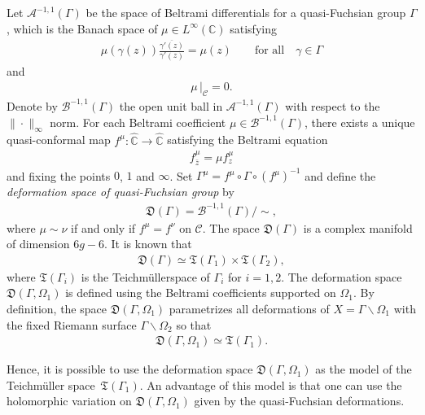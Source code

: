 \documentclass[10pt,a4paper]{amsart}
\numberwithin{equation}{section}
\newcommand{\Te}{Teichm\"{u}ller\:}
\begin{document}
Let $\mathcal{A}^{-1,1}(\Gamma)$ be the space of Beltrami differentials for a quasi-Fuchsian group $\Gamma$, which is the Banach space of $\mu\in L^\infty(\mathbb{C})$ satisfying
\begin{gather*}
\mu(\gamma(z)) \frac{\overline{\gamma'(z)}}{\gamma'(z)} =\mu(z) \qquad \text{for all}\quad \gamma\in\Gamma
\end{gather*}
and
\begin{gather*}
\mu\, \big|_{\mathcal{C}} =0.
\end{gather*}
Denote by $\mathcal{B}^{-1,1}(\Gamma)$ the open unit ball in $\mathcal{A}^{-1,1}(\Gamma)$ with respect to the $\|\cdot\|_{\infty}$ norm. For each Beltrami coefficient
$\mu\in\mathcal{B}^{-1,1}(\Gamma)$, there exists a unique quasi-conformal map $f^\mu\colon\hat{\mathbb{C}} \to \hat{\mathbb{C}}$ satisfying the Beltrami equation
\begin{gather}\label{e:beltrami-eq}
f^\mu_{\bar{z}} =\mu f^\mu_z
\end{gather}
and fixing the points $0$, $1$ and $\infty$. Set $\Gamma^\mu= f^\mu \circ \Gamma\circ (f^\mu)^{-1}$ and define the \emph{deformation space of quasi-Fuchsian group} by
\begin{gather*}
\mathfrak{D}(\Gamma) =\mathcal{B}^{-1,1}(\Gamma)/ {\sim},
\end{gather*}
where $\mu\sim \nu$ if and only if $f^\mu=f^\nu$ on $\mathcal{C}$. The space $\mathfrak{D}(\Gamma)$ is a complex manifold of dimension $6g-6$. It is known that
\begin{gather*}%
\mathfrak{D}(\Gamma) \simeq \mathfrak{T}(\Gamma_1)\times {\mathfrak{T}}(\Gamma_2),
\end{gather*}
where $\mathfrak{T}(\Gamma_i)$ is the \Te space of $\Gamma_i$ for $i=1,2$.
The deformation space $\mathfrak{D}(\Gamma,\Omega_1)$ is defined using the Beltrami coefficients supported on $\Omega_1$. By definition,
the space $\mathfrak{D}(\Gamma,\Omega_1)$ parametrizes all deformations of $X=\Gamma\backslash \Omega_1$ with the fixed Riemann surface $\Gamma\backslash \Omega_2$ so that
\begin{gather*}
\mathfrak{D}(\Gamma,\Omega_1) \simeq \mathfrak{T}(\Gamma_1).
\end{gather*}
{\sloppy Hence, it is possible to use the deformation space $\mathfrak{D}(\Gamma,\Omega_1)$ as the model of the Teichm\"{u}ller space~$\mathfrak{T}(\Gamma_1)$.
An advantage of this model is that one can use the holomorphic variation on $\mathfrak{D}(\Gamma,\Omega_1)$ given by the quasi-Fuchsian deformations.

}
\end{document}
